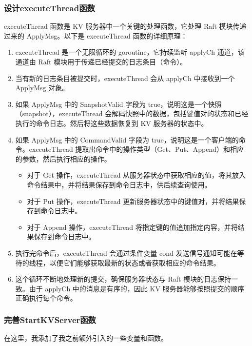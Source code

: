 \documentclass[]{article}
\begin{document}
	\subsubsection{设计executeThread函数}
	executeThread 函数是 KV 服务器中一个关键的处理函数，它处理 Raft 模块传递过来的 ApplyMsg。以下是 executeThread 函数的详细原理：
	\begin{enumerate}
	    \item executeThread 是一个无限循环的 goroutine，它持续监听 applyCh 通道，该通道由 Raft 模块用于传递已经提交的日志条目（命令）。
	
	    \item 当有新的日志条目被提交时，executeThread 会从 applyCh 中接收到一个 ApplyMsg 对象。
	
	    \item 如果 ApplyMsg 中的 SnapshotValid 字段为 true，说明这是一个快照（snapshot），executeThread 会解码快照中的数据，包括键值对的状态和已经执行的命令日志。然后将这些数据恢复到 KV 服务器的状态中。
	
	    \item 如果 ApplyMsg 中的 CommandValid 字段为 true，说明这是一个客户端的命令。executeThread 提取出命令中的操作类型（Get、Put、Append）和相应的参数，然后执行相应的操作。
		\begin{itemize}
	        \item 对于 Get 操作，executeThread 从服务器状态中获取相应的值，将其放入命令结果中，并将结果保存到命令日志中，供后续查询使用。
	
	        \item 对于 Put 操作，executeThread 更新服务器状态中的键值对，并将结果保存到命令日志中。
	
	        \item 对于 Append 操作，executeThread 将指定键的值追加指定内容，并将结果保存到命令日志中。
		\end{itemize}
	    \item 执行完命令后，executeThread 会通过条件变量 cond 发送信号通知可能在等待的线程，以便它们能够获取最新的状态或者获取相应的命令结果。
	
	    \item 这个循环不断地处理新的提交，确保服务器状态与 Raft 模块的日志保持一致。由于 applyCh 中的消息是有序的，因此 KV 服务器能够按照提交的顺序正确执行每个命令。
	\end{enumerate}
	
	\subsubsection{完善StartKVServer函数}
	在这里，我添加了我之前额外引入的一些变量和函数。
	
\end{document}
